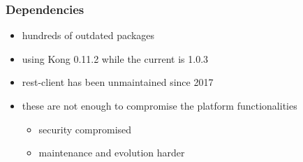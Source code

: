 \documentclass{beamer}
\begin{document}
  \begin{frame}
    \frametitle{Dependencies}

    \begin{itemize}
      \item hundreds of outdated packages
      \item using Kong 0.11.2 while the current is 1.0.3
      \item rest-client has been unmaintained since 2017
      \item these are not enough to compromise the platform functionalities
        \begin{itemize}
          \item security compromised
          \item maintenance and evolution harder
        \end{itemize}
    \end{itemize}
  \end{frame}
\end{document}
